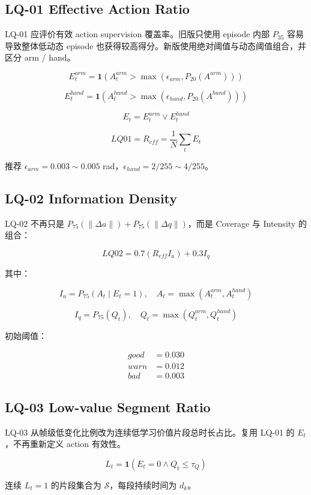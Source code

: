 \documentclass[UTF8,zihao=-4]{ctexart}
\begin{document}
\subsection{LQ-01 Effective Action Ratio}

LQ-01 应评价有效 action supervision 覆盖率。旧版只使用 episode 内部 \(P_{35}\) 容易导致整体低动态 episode 也获得较高得分。新版使用绝对阈值与动态阈值组合，并区分 arm / hand。

\[
E_t^{arm}=\mathbf1(A_t^{arm}>\max(\epsilon_{arm},P_{20}(A^{arm})))
\]

\[
E_t^{hand}=\mathbf1(A_t^{hand}>\max(\epsilon_{hand},P_{20}(A^{hand})))
\]

\[
E_t=E_t^{arm}\lor E_t^{hand}
\]

\[
LQ01=R_{eff}=\frac{1}{N}\sum_t E_t
\]

推荐 \(\epsilon_{arm}=0.003\sim0.005\) rad，\(\epsilon_{hand}=2/255\sim4/255\)。

\subsection{LQ-02 Information Density}

LQ-02 不再只是 \(P_{75}(\|\Delta a\|)+P_{75}(\|\Delta q\|)\)，而是 Coverage 与 Intensity 的组合：

\[
LQ02=0.7(R_{eff}I_a)+0.3I_q
\]

其中：

\[
I_a=P_{75}(A_t \mid E_t=1),\quad A_t=\max(A_t^{arm},A_t^{hand})
\]

\[
I_q=P_{75}(Q_t),\quad Q_t=\max(Q_t^{arm},Q_t^{hand})
\]

初始阈值：

\[
\begin{aligned}
good &= 0.030\\
warn &= 0.012\\
bad &= 0.003
\end{aligned}
\]

\subsection{LQ-03 Low-value Segment Ratio}

LQ-03 从帧级低变化比例改为连续低学习价值片段总时长占比。复用 LQ-01 的 \(E_t\)，不再重新定义 action 有效性。

\[
L_t=\mathbf1(E_t=0 \land Q_t\le \tau_Q)
\]

连续 \(L_t=1\) 的片段集合为 \(\mathcal{S}\)，每段持续时间为 \(d_k\)。
\end{document}

